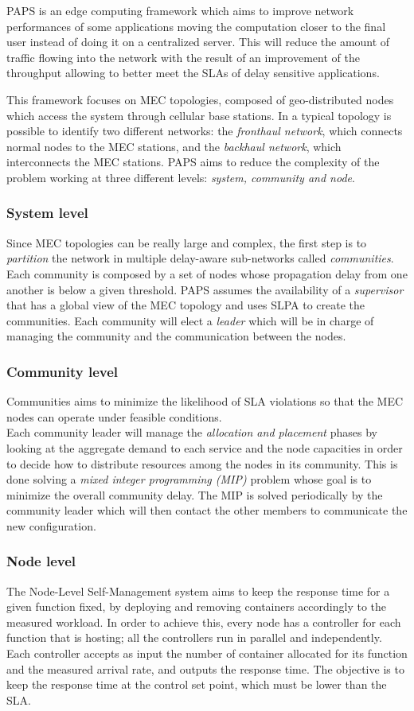 PAPS is an edge computing framework which aims to improve network performances of some 
applications moving the computation closer to the final user instead of doing it on 
a centralized server. This will reduce the amount of traffic flowing into the network
with the result of an improvement of the throughput allowing to better meet the SLAs
of delay sensitive applications.

This framework focuses on MEC topologies, composed of geo-distributed nodes which access
the system through cellular base stations. In a typical topology is possible to identify
two different networks: the \textit{fronthaul network}, which connects normal nodes to 
the MEC stations, and the \textit{backhaul network}, which interconnects the MEC stations.
PAPS aims to reduce the complexity of the problem working at three different levels: 
\textit{system, community and node}. 
\\
\subsubsection*{System level}
Since MEC topologies can be really large and complex, the first step is to \textit{partition}
the network in multiple delay-aware sub-networks called \textit{communities}. Each community
is composed by a set of nodes whose propagation delay from one another is below a given 
threshold. PAPS assumes the availability of a \textit{supervisor} that has a global view of
the MEC topology and uses SLPA \cite{SLPA} to create the communities. Each community will
elect a \textit{leader} which will be in charge of managing the community and the communication
between the nodes.

\subsubsection*{Community level}
Communities aims to minimize the likelihood of SLA violations so that the MEC nodes
can operate under feasible conditions.\\
Each community leader will manage the \textit{allocation and placement} phases by looking at 
the aggregate demand to each service and the node capacities in order to decide how to 
distribute resources among the nodes in its community. This is done solving a \textit{mixed
integer programming (MIP)} problem whose goal is to minimize the overall community delay. 
The MIP is solved periodically by the community leader which will then contact the other members
to communicate the new configuration.

\subsubsection*{Node level}
The Node-Level Self-Management system aims to keep the response time for a given function fixed, 
by deploying and removing containers accordingly to the measured workload.
In order to achieve this, every node has a controller for each function that is hosting; all the controllers
run in parallel and independently.
Each controller accepts as input the number of container allocated for its function and the 
measured arrival rate, and outputs the response time. The objective is to keep the response time
at the control set point, which must be lower than the SLA.
